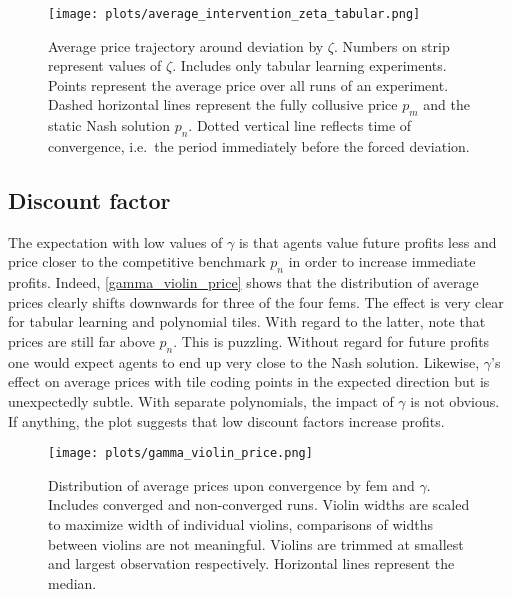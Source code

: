 \begin{figure}
	\texttt{[image: plots/average\_intervention\_zeta\_tabular.png]}
	\caption[Average price trajectory around deviation by $\zeta$]{Average price trajectory around deviation by $\zeta$. Numbers on strip represent values of $\zeta$. Includes only tabular learning experiments. Points represent the average price over all runs of an experiment. Dashed horizontal lines represent the fully collusive price $p_m$ and the static Nash solution $p_n$. Dotted vertical line reflects time of convergence, i.e.\ the period immediately before the forced deviation.}
	\label{average_intervention_zeta_tabular}
\end{figure}

\clearpage

\subsection{Discount factor}\label{discounting_appendix}

The expectation with low values of $\gamma$ is that agents value future profits less and price closer to the competitive benchmark $p_n$ in order to increase immediate profits. Indeed, \autoref{gamma_violin_price} shows that the distribution of average prices clearly shifts downwards for three of the four \gls{fem}s. The effect is very clear for tabular learning and polynomial tiles. With regard to the latter, note that prices are still far above $p_n$. This is puzzling. Without regard for future profits one would expect agents to end up very close to the Nash solution. Likewise, $\gamma$'s effect on average prices with tile coding points in the expected direction but is unexpectedly subtle. With separate polynomials, the impact of $\gamma$ is not obvious. If anything, the plot suggests that low discount factors increase profits.

\begin{figure}
	\texttt{[image: plots/gamma\_violin\_price.png]}
	\caption[Distribution of average prices by \gls{fem} and $\gamma$]{Distribution of average prices upon convergence by \gls{fem} and $\gamma$. Includes converged and non-converged runs. Violin widths are scaled to maximize width of individual violins, comparisons of widths between violins are not meaningful. Violins are trimmed at smallest and largest observation respectively. Horizontal lines represent the median.}
	\label{gamma_violin_price}
\end{figure}

